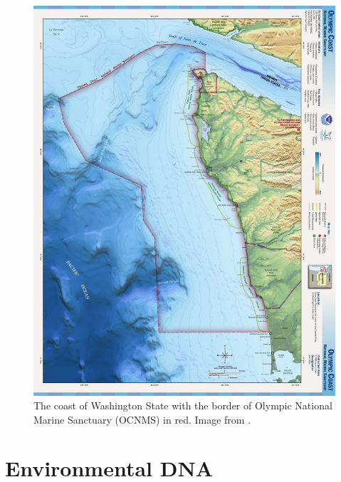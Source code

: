 \documentclass[12pt,twoside]{reedthesis}
\begin{document}
\begin{figure}[htbp]
	\begin{center}
		\includegraphics[scale=0.5]{Fig_OCNMS_Map}
		\caption[Map of OCNMS]{\footnotesize{The coast of Washington State with the border of Olympic National Marine Sanctuary (OCNMS) in red. Image from \autocite{OlympicCoastNationalb}.}} %
	\end{center}
	\label{OCNMSMap}
\end{figure} 
	
\section{Environmental DNA}
\end{document}

